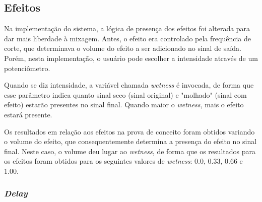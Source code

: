 \subsection{Efeitos}

Na implementação do sistema, a lógica de presença dos efeitos foi alterada para dar mais liberdade à mixagem. Antes, o efeito era controlado pela frequência de corte, que determinava o volume do efeito a ser adicionado no sinal de saída. Porém, nesta implementação, o usuário pode escolher a intensidade através de um potenciômetro.

Quando se diz intensidade, a variável chamada \textit{wetness} é invocada, de forma que esse parâmetro indica quanto sinal seco (sinal original) e "molhado" (sinal com efeito) estarão presentes no sinal final. Quando maior o \textit{wetness}, mais o efeito estará presente. 

Os resultados em relação aos efeitos na prova de conceito foram obtidos variando o volume do efeito, que consequentemente determina a presença do efeito no sinal final. Neste caso, o volume deu lugar ao \textit{wetness}, de forma que os resultados para os efeitos foram obtidos para os seguintes valores de \textit{wetness}: 0.0, 0.33, 0.66 e 1.00. 

\subsubsection*{\textit{Delay}}


